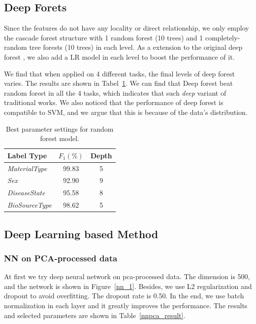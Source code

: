 \documentclass[sigconf]{acmart}
\begin{document}
\subsection{Deep Forets}
Since the features do not have any locality or direct relationship, we only employ the cascade forest structure with 1 random forest (10 trees) and 1 completely-random tree forests (10 trees) in each level. As a extension to the original deep forest \cite{zhou2017deep}, we also add a LR model in each level to boost the performance of it. 

We find that when applied on 4 different tasks, the final levels of deep forest varies. The results are shown in Tabel~\ref{tab:DeepForest}. We can find that Deep forest beat random forest in all the 4 tasks, which indicates that such \textit{deep} variant of traditional works. We also noticed that the performance of deep forest is compatible to SVM, and we argue that this is because of the data's distribution.
\begin{table}[tbp]
	\centering
	\begin{tabular}{l|cc}
		\toprule
		{Label Type} & $F_1 (\%)$&Depth\\
		\midrule
		{\textit{MaterialType}}&99.83 &5\\
		{\textit{Sex}}		& 92.90  &9\\
		{\textit{DiseaseState}}& 95.58 &8 \\
		{\textit{BioSourceType}}& 98.62 &5\\
		\bottomrule	
	\end{tabular}
	\caption{Best parameter settings for random forest model. }
	\label{tab:DeepForest}
\end{table}

\subsection{Deep Learning based Method}

\subsubsection{ NN on PCA-processed data}
At first we try deep neural network on   pca-processed data. The dimension is 500, and the network is shown in Figure~\ref{nn_1}. Besides,  we use L2 regularization and dropout to avoid overfitting. The dropout rate is 0.50. In the end, we use batch normalization in each layer and it greatly improves the performance. The results and selected parameters are shown in Table~\ref{nnpca_result}.
	
\end{document}

